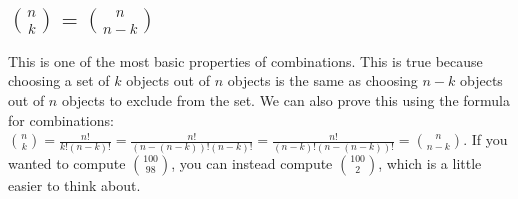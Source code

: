 \documentclass[twocolumn]{article}
\begin{document}
\subsection*{$\binom{n}{k} = \binom{n}{n - k}$}
This is one of the most basic properties of combinations. This is true because 
choosing a set of $k$ objects out of $n$ objects is the same as choosing $n - k$ 
objects out of $n$ objects to exclude from the set. We can also prove this using 
the formula for combinations: $\binom{n}{k} = \frac{n!}{k!(n - k)!} = 
\frac{n!}{(n - (n - k))!(n - k)!} = \frac{n!}{(n - k)!(n - (n - k))!} = 
\binom{n}{n - k}$. If you wanted to compute $\binom{100}{98}$, you can instead 
compute $\binom{100}{2}$, which is a little easier to think about.
\end{document}
